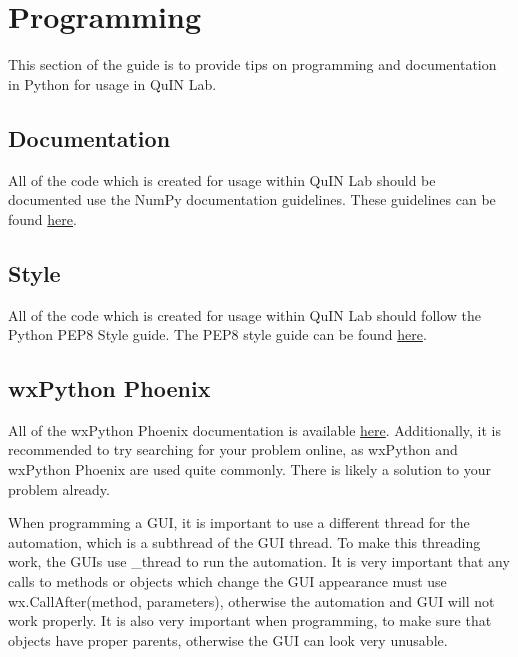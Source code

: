 \documentclass[11pt, letterpaper, titlepage]{article}
\begin{document}
\section{Programming} %
This section of the guide is to provide tips on programming and documentation in Python for usage in QuIN Lab.
\subsection{Documentation} %
All of the code which is created for usage within QuIN Lab should be documented use the NumPy documentation guidelines.
These guidelines can be found \href{https://github.com/numpy/numpy/blob/master/doc/HOWTO_DOCUMENT.rst.txt}{here}.
\subsection{Style} %
All of the code which is created for usage within QuIN Lab should follow the Python PEP8 Style guide.
The PEP8 style guide can be found \href{https://www.python.org/dev/peps/pep-0008/}{here}.
\subsection{wxPython Phoenix} %
All of the wxPython Phoenix documentation is available \href{https://wxpython.org/Phoenix/docs/html/main.html}{here}.
Additionally, it is recommended to try searching for your problem online, as wxPython and wxPython Phoenix are used quite commonly.
There is likely a solution to your problem already.

When programming a GUI, it is important to use a different thread for the automation, which is a subthread of the GUI thread.
To make this threading work, the GUIs use \_thread to run the automation.
It is very important that any calls to methods or objects which change the GUI appearance must use wx.CallAfter(method, parameters), otherwise the automation and GUI will not work properly.
It is also very important when programming, to make sure that objects have proper parents, otherwise the GUI can look very unusable.
\end{document}
